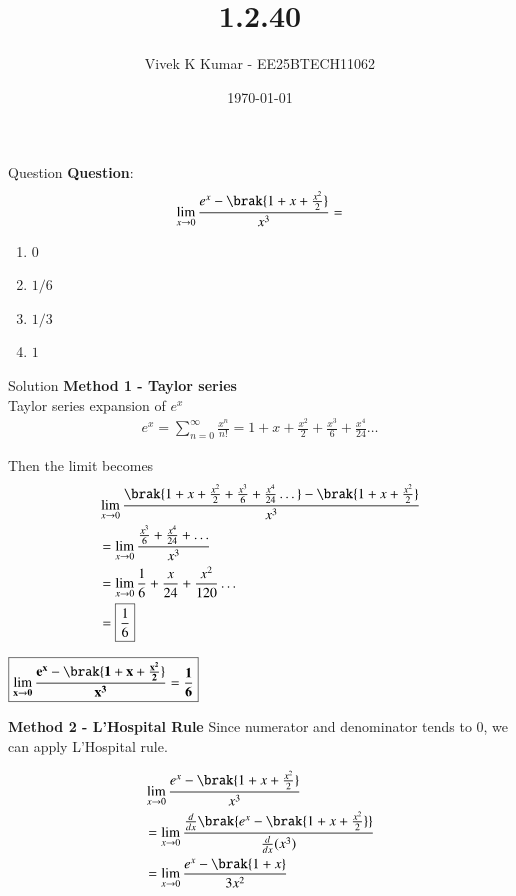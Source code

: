 \documentclass{beamer}
\title 
{1.2.40}
\date{\today}
\author 
{Vivek K Kumar - EE25BTECH11062}
\begin{document}
\frame{\titlepage}

\begin{frame}{Question}
\textbf{Question}:\\
\begin{align}
    \lim\limits_{x\to0} \frac{e^x-\brak{1+x+\frac{x^2}{2}}}{x^3} = 
\end{align}
\begin{enumerate}
    \item $0$
    \item $1/6$
    \item $1/3$
    \item $1$
\end{enumerate}
\end{frame}

\begin{frame}{Solution}
\textbf{Method 1 - Taylor series}\\
Taylor series expansion of $e^x$
\begin{align}
    e^x = \sum\limits_{n=0}^\infty \frac{x^n}{n!} = 1+x+\frac{x^2}{2}+\frac{x^3}{6}+\frac{x^4}{24} \dots
\end{align}

Then the limit becomes
\begin{align}
    &\lim\limits_{x\to0}\frac{\brak{1+x+\frac{x^2}{2}+\frac{x^3}{6}+\frac{x^4}{24} \dots} - \brak{1+x+\frac{x^2}{2}}}{x^3} \\
    &= \lim\limits_{x\to0} \frac{\frac{x^3}{6} + \frac{x^4}{24} + \dots}{x^3} \\
    &= \lim\limits_{x\to0} \frac{1}{6} + \frac{x}{24} + \frac{x^2}{120}\dots \\
   & = \boxed{\frac{1}{6}}
\end{align}
\begin{center}
$\boxed{\mathbf{ \lim\limits_{x\to0} \frac{e^x-\brak{1+x+\frac{x^2}{2}}}{x^3} = \frac{1}{6}}}$
\end{center}

\textbf{Method 2 - L'Hospital Rule}
Since numerator and denominator tends to 0, we can apply L'Hospital rule. 

\begin{align}
    &\lim\limits_{x\to0} \frac{e^x-\brak{1+x+\frac{x^2}{2}}}{x^3} \\
    &= \lim\limits_{x\to0}\frac{\frac{d}{dx}\brak{e^x - \brak{1+x+\frac{x^2}{2}}}}{\frac{d}{dx}(x^3)} \\
    &= \lim\limits_{x\to0} \frac{e^x - \brak{1+x}}{3x^2}    
\end{align}


\end{frame}
\end{document}
